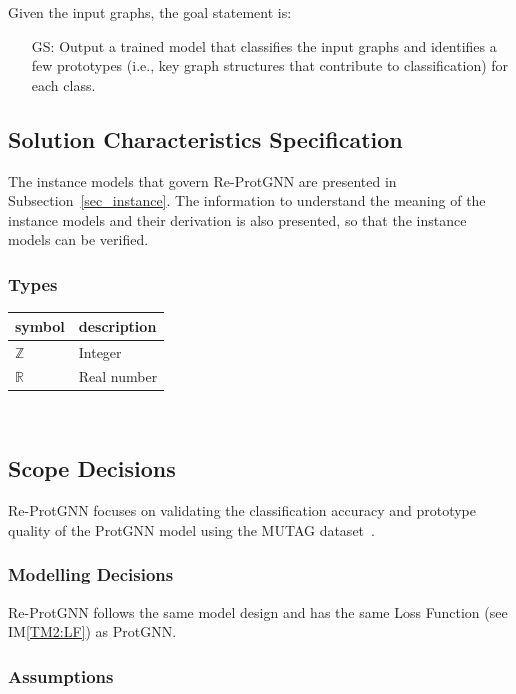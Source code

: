 \documentclass[12pt]{article}
\newcounter{goalnum} %
\newcommand{\iref}[1]{IM\ref{#1}}
\begin{document}
\noindent Given the input graphs, the goal statement is:

\begin{itemize}

\item[GS\refstepcounter{goalnum}\thegoalnum \label{GS1}:] Output a trained model that classifies the input graphs and identifies a few prototypes (i.e., key graph structures that contribute to classification) for each class.

\end{itemize}

\subsection{Solution Characteristics Specification}

The instance models that govern Re-ProtGNN are presented in
Subsection~\ref{sec_instance}.  The information to understand the meaning of the
instance models and their derivation is also presented, so that the instance
models can be verified.

\subsubsection{Types}

\begin{tabular}{l l} 
  \toprule		
  \textbf{symbol} & \textbf{description}\\
  \midrule 
  $\mathbb{Z}$ & Integer\\
  $\mathbb{R}$ & Real number\\
  \bottomrule
\end{tabular}\\

\subsection{Scope Decisions} \label{sec_scopeDec}
Re-ProtGNN focuses on validating the classification accuracy and prototype quality of the ProtGNN model using the MUTAG dataset~\cite{debnath1991structure}.


\subsubsection{Modelling Decisions}
Re-ProtGNN follows the same model design and has the same Loss Function (see \iref{TM2:LF}) as ProtGNN.

\subsubsection{Assumptions} \label{sec_assumpt}
\end{document}
